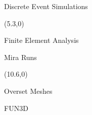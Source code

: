 \documentclass{beamer}
\begin{document}
\begin{textblock}{15.6}
\begin{textblock}{5}
\begin{block}{Discrete Event Simulations}
          \end{block}
        \end{textblock}
        \begin{textblock}{5}(5.3,0)
          \begin{block}{Finite Element Analysis}
            
          \end{block}
          \begin{block}{Mira Runs}

          \end{block}
        \end{textblock}
        \begin{textblock}{5}(10.6,0)
          \begin{block}{Overset Meshes}
            
          \end{block}
          \begin{block}{FUN3D}

          \end{block}
        \end{textblock}
      \end{textblock}
\end{document}

